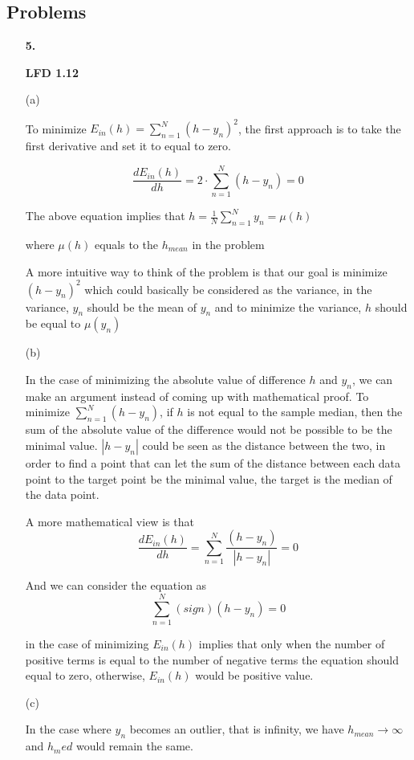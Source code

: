 \documentclass[11pt]{article}
\begin{document}
\subsection*{Problems}
\begin{enumerate}

\item[\textbf{5.}]

\textbf{LFD 1.12}

(a)

To minimize $E_{in}(h) = \sum_{n=1}^{N}(h-y_n)^2$, the first approach is to take the first derivative and set it to equal to zero.

$$\frac{dE_{in}(h)}{dh} = 2 \cdot \sum_{n=1}^{N}(h-y_n) = 0$$ 

The above equation implies that $h = \frac{1}{N}\sum_{n=1}^{N}y_n = \mu(h)$

where $\mu(h)$ equals to the $h_{mean}$ in the problem

A more intuitive way to think of the problem is that our goal is minimize $(h-y_n)^2$ which could basically be considered as the variance, in the variance, $y_n$ should be the mean of $y_n$ and to minimize the variance, $h$ should be equal to $\mu(y_n)$

(b)

In the case of minimizing the absolute value of difference $h$ and $y_n$, we can make an argument instead of coming up with mathematical proof. To minimize $\sum_{n=1}^{N}(h-y_n)$, if $h$ is not equal to the sample median, then the sum of the absolute value of the difference would not be possible to be the minimal value. $|h-y_n|$ could be seen as the distance between the two, in order to find a point that can let the sum of the distance between each data point to the target point be the minimal value, the target is the median of the data point.

A more mathematical view is that 
$$\frac{dE_{in}(h)}{dh} = \sum_{n=1}^{N}\frac{(h-y_n)}{|h-y_n|} = 0$$

And we can consider the equation as $$
\sum_{n=1}^{N} (sign)(h-y_n) = 0$$

in the case of minimizing $E_{in}(h)$ implies that only when the number of positive terms is equal to the number of negative terms the equation should equal to zero, otherwise, $E_{in}(h)$ would be positive value.

(c)

In the case where $y_n$ becomes an outlier, that is infinity, we have $h_{mean} \rightarrow \infty$ and $h_med$ would remain the same.

 
\end{enumerate}
\pagebreak
\end{document}
